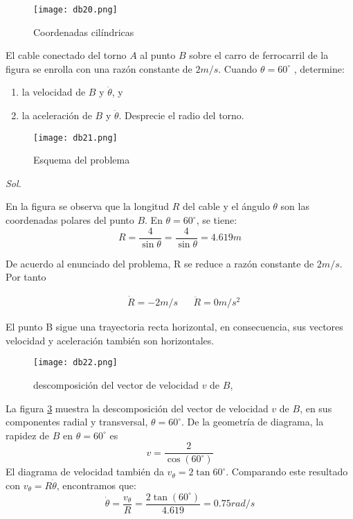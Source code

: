 \begin{figure}[h!]
  \centerline{\texttt{[image: db20.png]}}
  \caption{Coordenadas cilíndricas}
  \label{db20}
\end{figure}

\begin{example}
    El cable conectado del torno $A$ al punto $B$ sobre el
carro de ferrocarril de la figura se enrolla con una razón constante de $2 m/s$. Cuando $\theta=60^{\circ}$ , determine: 
\begin{enumerate}
    \item la velocidad de $B$ y $\dot{\theta}$, y
    \item la aceleración de $B$ y $\ddot{\theta}$. Desprecie el radio del torno.
\end{enumerate}
\end{example}

\begin{figure}[h!]
  \centerline{\texttt{[image: db21.png]}}
  \caption{Esquema del problema}
  \label{db21}
\end{figure}

\textit{ Sol. }

En la figura se observa que la longitud $R$ del cable y el
ángulo $\theta$ son las coordenadas polares del punto $B$. En $\theta=60^{\circ}$, se tiene:
\begin{equation*}
    R=\frac{4}{\sin{\theta}}=\frac{4}{\sin{\theta}}=4.619m
\end{equation*}

De acuerdo al enunciado del problema, R se reduce a razón
constante de $2 m/s$. Por tanto

\begin{align*}
    &\dot{R} = -2 m/s &&\ddot{R}= 0 m/s^2
\end{align*}

El punto B sigue una trayectoria recta horizontal, en
consecuencia, sus vectores velocidad y aceleración
también son horizontales.

\begin{figure}[h!]
    \centerline{\texttt{[image: db22.png]}}
    \caption{descomposición del vector de velocidad $v$ de $B$,}
    \label{db22}
  \end{figure}

La figura \ref{db22} muestra la descomposición del vector de
velocidad $v$ de $B$, en sus componentes radial y transversal,
$\theta = 60^{\circ}$. De la geometría de diagrama, la rapidez de $B$ en
$\theta = 60^{\circ}$ es
\begin{equation*}
    v=\frac{2}{\cos{(60^{\circ})}}
\end{equation*}
El diagrama de velocidad también da $v_{\theta}=2\tan{60^{\circ}}$.
Comparando este resultado con $v_{\theta} = R\dot{\theta}$, encontramos
que:
\begin{equation*}
    \dot{\theta}=\frac{v_{\theta}}{R}=\frac{2\tan{(60^{\circ})}}{4.619}=0.75rad/s
\end{equation*}

